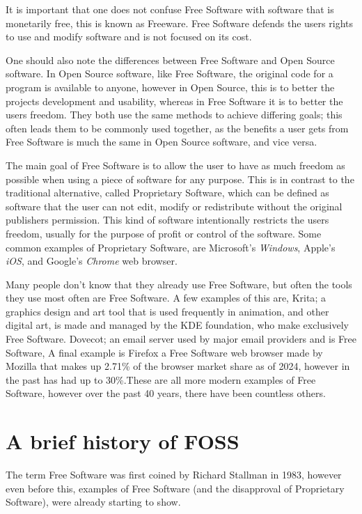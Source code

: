 \documentclass[a4paper,12pt]{article}
\begin{document}
{It is important that one does not confuse Free Software with software that is monetarily free, 
this is known as Freeware. Free Software defends the users rights to use and modify software and
is not focused on its cost.

One should also note the differences between Free Software and Open Source software. In Open Source
software, like Free Software, the original code for a program is available to anyone, however
in Open Source, this is to better the projects development and usability, whereas in Free Software
it is to better the users freedom. They both use the same methods to achieve differing goals; this
often leads them to be commonly used together, as the benefits a user gets from Free Software is 
much the same in Open Source software, and vice versa.

The main goal of Free Software is to allow the user to have as much freedom as possible when using 
a piece of software for any purpose. This is in contrast to the traditional alternative, called
Proprietary Software, which can be defined as software that the user can not edit, modify or 
redistribute without the original publishers permission. This kind of software intentionally 
restricts the users freedom, usually for the purpose of profit or control of the software. Some 
common examples of Proprietary Software, are Microsoft's \textit{Windows}, Apple's \textit{iOS}, 
and Google's \textit{Chrome} web browser.

Many people don't know that they already use Free Software\cite{COMMONfoss}, but often the tools
they use most often are Free Software. A few examples of this are, Krita\cite{KRITA}; a graphics 
design and art tool that is used frequently in animation, and other digital art, is made and 
managed by the KDE foundation\cite{KDE}, who make exclusively Free Software. Dovecot\cite{DOVECOT}; 
an email server used by major email providers and is Free Software, A final example is 
Firefox\cite{FIREFOX} a Free Software web browser made by Mozilla that makes up 2.71\% of the 
browser market share as of 2024, however in the past has had up to 30\%\cite{BROWSERmarketshare}.These 
are all more modern examples of Free Software, however over the past 40 years, there have 
been countless others. 

\section{A brief history of FOSS}
The term Free Software was first coined by Richard Stallman in 1983\cite{GNUproject}, however even
before this, examples of Free Software (and the disapproval of Proprietary Software), were already
starting to show. 

}
\end{document}
